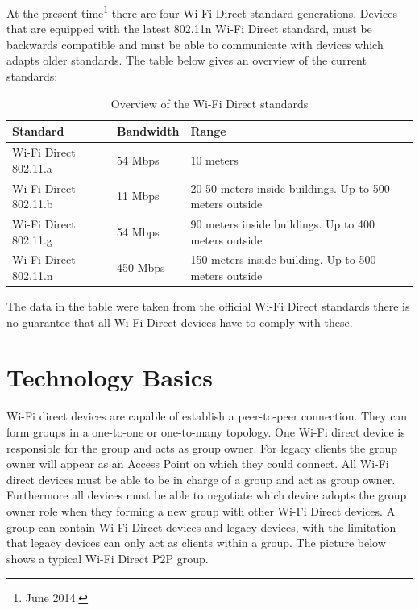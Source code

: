 \noindent At the present time\footnote{\label{foot:1}June 2014.} there are four Wi-Fi Direct standard generations. Devices that are equipped with the latest 802.11n Wi-Fi Direct standard, must be backwards compatible and must be able to communicate with devices which adapts older standards. The table below gives an overview of the current standards:

\begin{center}
	\begin{table}[h]
    	\begin{tabular}{| l | l | p{6cm} |}
    	\hline
    	Standard & Bandwidth & Range\\ \hline
		Wi-Fi Direct 802.11.a & 54 Mbps & 10 meters \\ \hline
		Wi-Fi Direct 802.11.b & 11 Mbps & 20-50 meters inside buildings. \newline
		Up to 500 meters outside\\ \hline
		Wi-Fi Direct 802.11.g & 54 Mbps & 90 meters inside buildings. \newline
		Up to 400 meters outside\\ \hline
		Wi-Fi Direct 802.11.n & 450 Mbps & 150 meters inside building.\newline
		Up to 500 meters outside\\ \hline
    	\end{tabular}
    \caption{Overview of the Wi-Fi Direct standards }
    \label{table:Wi-Fi Direct}
    \end{table}
\end{center}
\noindent The data in the table were taken from the official Wi-Fi Direct standards there is no guarantee that all Wi-Fi Direct devices have to comply with these.
\section{Technology Basics}
\label{sec:TechnologyBascs}
Wi-Fi direct devices are capable of establish a peer-to-peer connection. They can form groups in a one-to-one or one-to-many topology. One Wi-Fi direct device is responsible for the group and acts as group owner. For legacy clients the group owner will appear as an Access Point on which they could connect.
All Wi-Fi direct devices must be able to be in charge of a group and act as group owner. Furthermore all devices must be able to negotiate which device adopts the group owner role when they forming a new group with other Wi-Fi Direct devices. A group can contain Wi-Fi Direct devices and legacy devices, with the limitation that legacy devices can only act as clients within a group. The picture below shows a typical Wi-Fi Direct P2P group.

